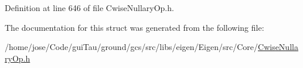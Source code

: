 Definition at line 646 of file Cwise\-Nullary\-Op.\-h.



The documentation for this struct was generated from the following file\-:\begin{DoxyCompactItemize}
\item 
/home/jose/\-Code/gui\-Tau/ground/gcs/src/libs/eigen/\-Eigen/src/\-Core/\hyperlink{_cwise_nullary_op_8h}{Cwise\-Nullary\-Op.\-h}\end{DoxyCompactItemize}
